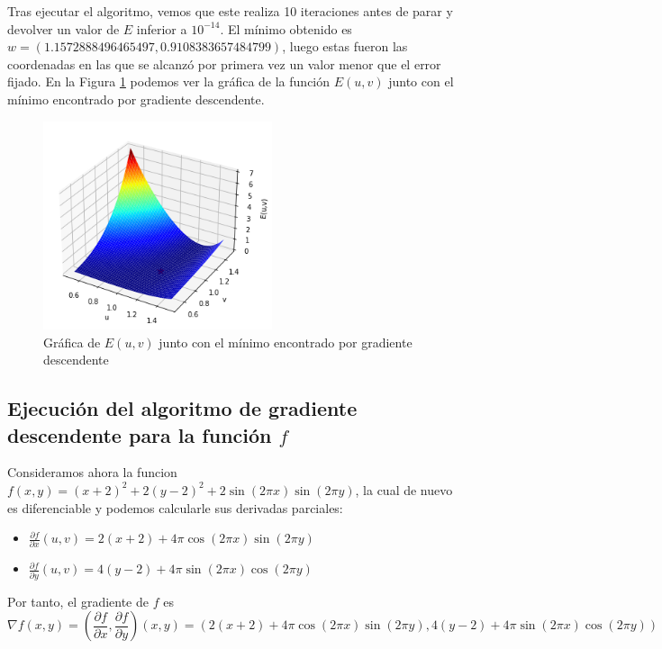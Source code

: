 \documentclass[10pt,a4paper]{article}
\begin{document}
Tras ejecutar el algoritmo, vemos que este realiza 10 iteraciones antes de parar y devolver un valor de $E$ inferior a $10^{-14}$. El mínimo obtenido es $w = (1.1572888496465497, 0.9108383657484799)$, luego estas fueron las coordenadas en las que se alcanzó por primera vez un valor menor que el error fijado. En la Figura \ref{fig:ej1.2} podemos ver la gráfica de la función $E(u,v)$ junto con el mínimo encontrado por gradiente descendente.

\begin{figure}[h]
	\centering
	\includegraphics[width=0.6\textwidth]{ej1.2}
	\caption{Gráfica de $E(u,v)$ junto con el mínimo encontrado por gradiente descendente}
	\label{fig:ej1.2}
\end{figure}



\subsection{Ejecución del algoritmo de gradiente descendente para la función $f$}

Consideramos ahora la funcion $f(x,y) = (x+2)^2 + 2 (y-2)^2 + 2 \sin (2 \pi x) \sin (2 \pi y)$, la cual de nuevo es diferenciable y podemos calcularle sus derivadas parciales:

\begin{itemize}
	\item $\frac{\partial f}{\partial x}(u,v) = 2 (x+2) + 4 \pi \cos (2 \pi x) \sin (2 \pi y)$
	\item $\frac{\partial f}{\partial y}(u,v) = 4 (y-2) + 4 \pi \sin (2 \pi x) \cos (2 \pi y)$
\end{itemize}

Por tanto, el gradiente de $f$ es $$\nabla f(x,y) = (\frac{\partial f}{\partial x},\frac{\partial f}{\partial y})(x,y) = (2 (x+2) + 4 \pi \cos (2 \pi x) \sin (2 \pi y), 4 (y-2) + 4 \pi \sin (2 \pi x) \cos (2 \pi y))$$
\end{document}
